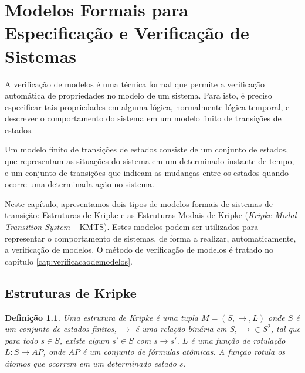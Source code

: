 \documentclass[normaltoc,capchap,capsec,times]{abnt}
\newtheorem{defi}{Definição}[section]
\begin{document}
\chapter{Modelos Formais para Especificação e Verificação de Sistemas}\label{cap:modelosformais}

A verificação de modelos é uma técnica formal que permite a verificação automática de propriedades no modelo de um sistema. Para isto, é preciso especificar tais propriedades em alguma lógica, normalmente lógica temporal, e descrever o comportamento do sistema em um modelo finito de transições de estados.

Um modelo finito de transições de estados consiste de um conjunto de estados, que representam as situações do sistema em um determinado instante de tempo, e um conjunto de transições que indicam as mudanças entre os estados quando ocorre uma determinada ação no sistema. 


Neste capítulo, apresentamos dois tipos de modelos formais de sistemas de transição: Estruturas de Kripke e as Estruturas Modais de Kripke (\textit{Kripke Modal Transition System} -- KMTS). Estes modelos podem ser utilizados para representar o comportamento de sistemas, de forma a realizar, automaticamente, a verificação de modelos. O método de verificação de modelos é tratado no capítulo \ref{cap:verificacaodemodelos}.   

\section{Estruturas de Kripke}\label{sec:kripke}

\begin{defi}
\textnormal{
Uma estrutura de Kripke é uma tupla $ M = (S, \to , L)$ onde $S$ é um conjunto de estados finitos, $\to$ é uma relação binária em S, $\to \in S^2$, tal que para todo $s \in S$, existe algum $s' \in S$ com $s \to s'$. $L$ é uma função de rotulação $L : S \to AP$, onde $AP$ é um conjunto de fórmulas atômicas. A função rotula os átomos que ocorrem em um determinado estado $s$. 
}
\end{defi}
\end{document}
